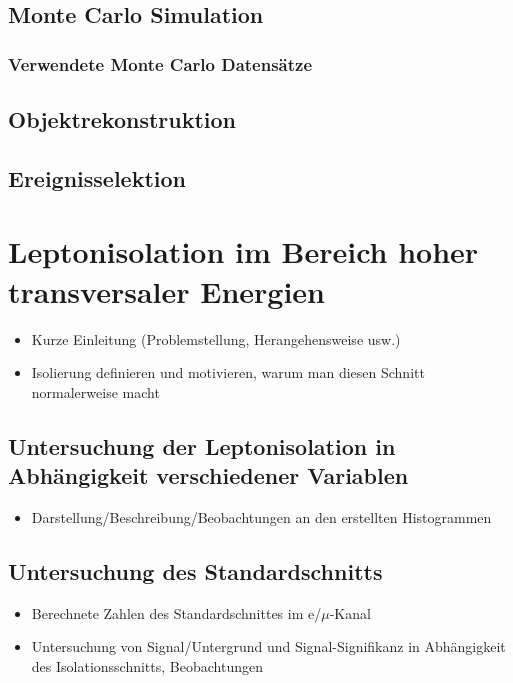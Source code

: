 \documentclass[12pt,a4paper]{article}
\begin{document}
\subsection{Monte Carlo Simulation}
\subsubsection{Verwendete Monte Carlo Datensätze}
\subsection{Objektrekonstruktion}
\subsection{Ereignisselektion}
\section{Leptonisolation im Bereich hoher transversaler Energien}
\begin{itemize}
\item Kurze Einleitung (Problemstellung, Herangehensweise usw.)
\item Isolierung definieren und  motivieren, warum man diesen Schnitt normalerweise macht
\end{itemize}
\subsection{Untersuchung der Leptonisolation in Abhängigkeit verschiedener Variablen}
\begin{itemize}
\item Darstellung/Beschreibung/Beobachtungen an den erstellten Histogrammen
\end{itemize}
\subsection{Untersuchung des Standardschnitts}
\begin{itemize}
\item Berechnete Zahlen des Standardschnittes im e/$\mu$-Kanal
\item Untersuchung von Signal/Untergrund und Signal-Signifikanz in Abhängigkeit des Isolationsschnitts, Beobachtungen
\end{itemize}
\end{document}
